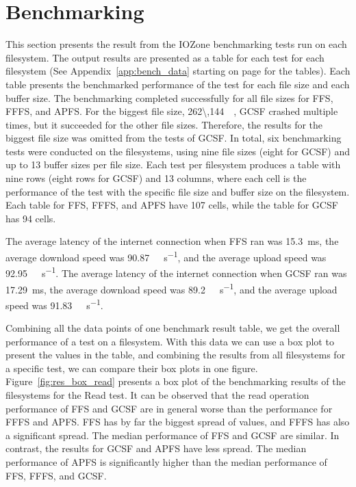 \section{Benchmarking}
\label{sec:res_bench}
This section presents the result from the IOZone benchmarking tests run on each filesystem. The output results are presented as a table for each test for each filesystem (See Appendix~\ref{app:bench_data} starting on page \pageref{app:bench_data} for the tables). Each table presents the benchmarked performance of the test for each file size and each buffer size. The benchmarking completed successfully for all file sizes for \gls{FFS}, \gls{FFFS}, and \gls{APFS}. For the biggest file size, \SI{262\,144}{\kilo\byte}, \gls{GCSF} crashed multiple times, but it succeeded for the other file sizes. Therefore, the results for the biggest file size was omitted from the tests of \gls{GCSF}. In total, six benchmarking tests were conducted on the filesystems, using nine file sizes (eight for \gls{GCSF}) and up to 13 buffer sizes per file size. Each test per filesystem produces a table with nine rows (eight rows for \gls{GCSF}) and 13 columns, where each cell is the performance of the test with the specific file size and buffer size on the filesystem. Each table for \gls{FFS}, \gls{FFFS}, and \gls{APFS} have 107 cells, while the table for \gls{GCSF} has 94 cells.

The average latency of the internet connection when \gls{FFS} ran was \SI{15.3}{\milli\second}, the average download speed was \SI[per-mode = symbol]{90.87}{\mega\bit\per\second}, and the average upload speed was \SI[per-mode = symbol]{92.95}{\mega\bit\per\second}. The average latency of the internet connection when \gls{GCSF} ran was \SI{17.29}{\milli\second}, the average download speed was \SI[per-mode = symbol]{89.2}{\mega\bit\per\second}, and the average upload speed was \SI[per-mode = symbol]{91.83}{\mega\bit\per\second}.

Combining all the data points of one benchmark result table, we get the overall performance of a test on a filesystem. With this data we can use a box plot to present the values in the table, and combining the results from all filesystems for a specific test, we can compare their box plots in one figure. Figure~\ref{fig:res_box_read} presents a box plot of the benchmarking results of the filesystems for the Read test. It can be observed that the read operation performance of \gls{FFS} and \gls{GCSF} are in general worse than the performance for \gls{FFFS} and \gls{APFS}. \gls{FFS} has by far the biggest spread of values, and \gls{FFFS} has also a significant spread. The median performance of \gls{FFS} and \gls{GCSF} are similar. In contrast, the results for \gls{GCSF} and \gls{APFS} have less spread. The median performance of \gls{APFS} is significantly higher than the median performance of \gls{FFS}, \gls{FFFS}, and \gls{GCSF}. 

